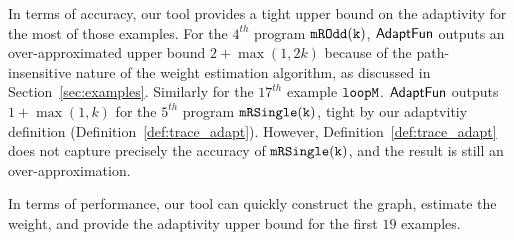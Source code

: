 In terms of accuracy, our tool provides a tight
upper bound on the adaptivity for the most of those examples. 
 For the $4^{th}$ program $\mathtt{mROdd(k)}$, $\textsf{AdaptFun}$ outputs an over-approximated upper bound 
 $2 + \max(1, 2k)$ because of the path-insensitive nature of the weight estimation algorithm, as discussed in Section~\ref{sec:examples}. 
 Similarly for the $17^{th}$ example $\mathtt{loopM}$. 
$\textsf{AdaptFun}$ outputs $1 + \max(1, k) $ for the $5^{th}$ program $\mathtt{mRSingle(k)}$,  tight by our adaptvitiy definition (Definition~\ref{def:trace_adapt}).
However, Definition~\ref{def:trace_adapt} does not capture precisely the accuracy  of $\mathtt{mRSingle(k)}$,
and the result is still an over-approximation.

In terms of performance, our tool can quickly construct the graph, estimate the weight,
and provide the adaptivity upper bound for the first $19$ examples. 


